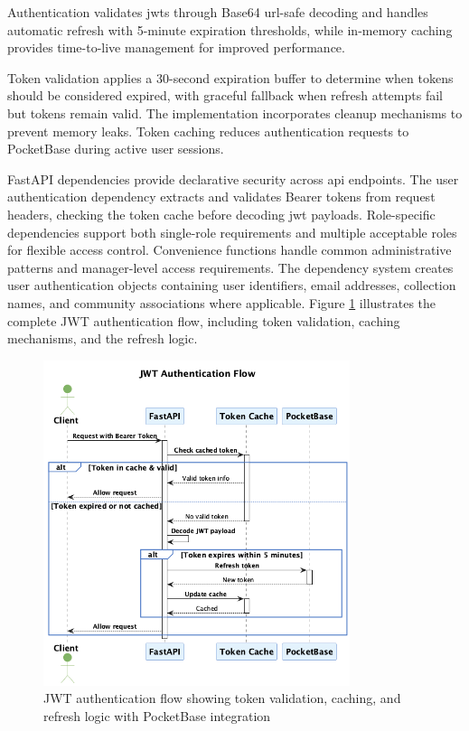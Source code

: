 Authentication validates \acp{jwt} through Base64 \acs{url}-safe decoding and handles automatic refresh with 5-minute expiration thresholds, while in-memory caching provides time-to-live management for improved performance.

Token validation applies a 30-second expiration buffer to determine when tokens should be considered expired, with graceful fallback when refresh attempts fail but tokens remain valid. The implementation incorporates cleanup mechanisms to prevent memory leaks. Token caching reduces authentication requests to PocketBase during active user sessions.

FastAPI dependencies provide declarative security across \ac{api} endpoints. The user authentication dependency extracts and validates Bearer tokens from request headers, checking the token cache before decoding \ac{jwt} payloads. Role-specific dependencies support both single-role requirements and multiple acceptable roles for flexible access control. Convenience functions handle common administrative patterns and manager-level access requirements. The dependency system creates user authentication objects containing user identifiers, email addresses, collection names, and community associations where applicable. Figure \ref{fig:jwt_auth_sequence} illustrates the complete JWT authentication flow, including token validation, caching mechanisms, and the refresh logic.

\begin{figure}[htbp]
    \centering
    \includegraphics[width=0.8\textwidth]{figs/chapter4/jwt_auth_simple.png}
    \caption[JWT Authentication Flow]{JWT authentication flow showing token validation, caching, and refresh logic with PocketBase integration}
    \label{fig:jwt_auth_sequence}
\end{figure}

